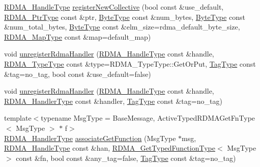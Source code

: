 \begin{DoxyCompactItemize}
\item 
\hyperlink{namespacevt_a10442579ec4e7ebef223818e64bcf908}{R\+D\+M\+A\+\_\+\+Handle\+Type} \hyperlink{structvt_1_1rdma_1_1_r_d_m_a_manager_a339763a690f218c3df58268a691ecfe4}{register\+New\+Collective} (bool const \&use\+\_\+default, \hyperlink{namespacevt_a9e2c953286c7616f7c218e9951790776}{R\+D\+M\+A\+\_\+\+Ptr\+Type} const \&ptr, \hyperlink{namespacevt_aab8d55968084610ce3b17057981e9300}{Byte\+Type} const \&num\+\_\+bytes, \hyperlink{namespacevt_aab8d55968084610ce3b17057981e9300}{Byte\+Type} const \&num\+\_\+total\+\_\+bytes, \hyperlink{namespacevt_aab8d55968084610ce3b17057981e9300}{Byte\+Type} const \&elm\+\_\+size=rdma\+\_\+default\+\_\+byte\+\_\+size, \hyperlink{structvt_1_1rdma_1_1_r_d_m_a_manager_a16e12d11cf7d771df0d3dc6947a4f95c}{R\+D\+M\+A\+\_\+\+Map\+Type} const \&map=default\+\_\+map)
\item 
void \hyperlink{structvt_1_1rdma_1_1_r_d_m_a_manager_a59de11a7b7a8034a2e8e27a10897ce01}{unregister\+Rdma\+Handler} (\hyperlink{namespacevt_a10442579ec4e7ebef223818e64bcf908}{R\+D\+M\+A\+\_\+\+Handle\+Type} const \&handle, \hyperlink{namespacevt_1_1rdma_ac848e1d9da43db6294bd06f83e5d3946}{R\+D\+M\+A\+\_\+\+Type\+Type} const \&type=R\+D\+M\+A\+\_\+\+Type\+Type\+::\+Get\+Or\+Put, \hyperlink{namespacevt_a84ab281dae04a52a4b243d6bf62d0e52}{Tag\+Type} const \&tag=no\+\_\+tag, bool const \&use\+\_\+default=false)
\item 
void \hyperlink{structvt_1_1rdma_1_1_r_d_m_a_manager_a34e50e7536bddd880c97b60b276b63ad}{unregister\+Rdma\+Handler} (\hyperlink{namespacevt_a10442579ec4e7ebef223818e64bcf908}{R\+D\+M\+A\+\_\+\+Handle\+Type} const \&handle, \hyperlink{namespacevt_a9530efb893c0f3846e8ac5f0507e0f49}{R\+D\+M\+A\+\_\+\+Handler\+Type} const \&handler, \hyperlink{namespacevt_a84ab281dae04a52a4b243d6bf62d0e52}{Tag\+Type} const \&tag=no\+\_\+tag)
\item 
{\footnotesize template$<$typename Msg\+Type  = Base\+Message, Active\+Typed\+R\+D\+M\+A\+Get\+Fn\+Type$<$ Msg\+Type $>$ $\ast$ f$>$ }\\\hyperlink{namespacevt_a9530efb893c0f3846e8ac5f0507e0f49}{R\+D\+M\+A\+\_\+\+Handler\+Type} \hyperlink{structvt_1_1rdma_1_1_r_d_m_a_manager_abcddc1a18794163032758fcf035ff406}{associate\+Get\+Function} (Msg\+Type $\ast$msg, \hyperlink{namespacevt_a10442579ec4e7ebef223818e64bcf908}{R\+D\+M\+A\+\_\+\+Handle\+Type} const \&han, \hyperlink{structvt_1_1rdma_1_1_r_d_m_a_manager_a0d865535d118fe9dcab074fd3df74ce1}{R\+D\+M\+A\+\_\+\+Get\+Typed\+Function\+Type}$<$ Msg\+Type $>$ const \&fn, bool const \&any\+\_\+tag=false, \hyperlink{namespacevt_a84ab281dae04a52a4b243d6bf62d0e52}{Tag\+Type} const \&tag=no\+\_\+tag)

\end{DoxyCompactItemize}
